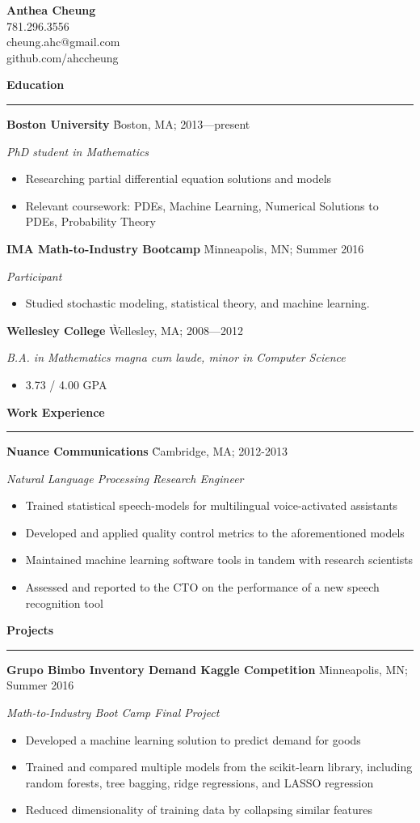 \documentclass[letter, 10pt]{article}
\newcommand{\job}[5]{

    \begin{tabbing} {\large \bf #1} \` {#2; #3} \end{tabbing}
    \vspace{-0.2cm}
    \textit{#4}
	\vspace{-0.1cm}
    \begin{itemize}
    \setlength\itemsep{1pt}
      #5
    \end{itemize}
  
}
\newcommand{\heading}[1]{
	\vspace{0.2cm} 
	{\Large \textbf{#1}}\par
 \vspace{-0.2cm}\rule{\textwidth}{0.5pt}\par
 \vspace{-0.2cm}
	  }
\begin{document}
\textheight=11in
\flushleft

\begin{multicols}{2}

\phantom\newline
{\Huge \textbf{Anthea Cheung}} \\
\hfill 781.296.3556 \\
\hfill cheung.ahc@gmail.com \\
\hfill github.com/ahccheung \\

\end{multicols}



\heading{Education}


\job{Boston University}
    {Boston, MA}
    {2013---present}
    {PhD student in Mathematics}{
    \item Researching partial differential equation solutions and models
    \item Relevant coursework: PDEs, Machine Learning, Numerical Solutions to PDEs, Probability Theory
}


\job{IMA Math-to-Industry Bootcamp}
    {Minneapolis, MN}
    {Summer 2016}
    {Participant}
    {
	\item Studied stochastic modeling, statistical theory, and machine learning.
}

\job{Wellesley College}
    {Wellesley, MA}
    {2008---2012}
    {B.A. in Mathematics \textit{magna cum laude}, minor in Computer Science}{
    \item 3.73 / 4.00 GPA
}

\heading{Work Experience}

\job{Nuance Communications}
    {Cambridge, MA}
    {2012-2013}
    {Natural Language Processing Research Engineer}{
    \item Trained statistical speech-models for multilingual voice-activated
      assistants
    \item Developed and applied quality control metrics to the aforementioned
      models
    \item Maintained machine learning software tools in tandem with research
      scientists
    \item Assessed and reported to the CTO on the performance of a new speech recognition tool
    }

\heading{Projects}

\job{Grupo Bimbo Inventory Demand Kaggle Competition}
	{Minneapolis, MN}
	{Summer 2016}
	{Math-to-Industry Boot Camp Final Project}{
	\item Developed a machine learning solution to predict demand for goods
	\item Trained and compared multiple models from the scikit-learn library, including random forests, tree bagging, ridge regressions, and LASSO regression
	\item Reduced dimensionality of training data by collapsing similar features
}
\end{document}
